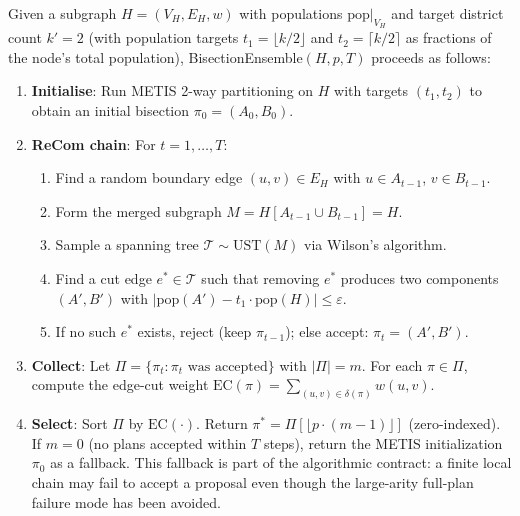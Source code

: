 \begin{definition}
  \label{def:be-primitive}
  Given a subgraph $H = (V_H, E_H, w)$ with populations $\text{pop}|_{V_H}$ and
  target district count $k' = 2$ (with population targets $t_1 = \lfloor k/2
  \rfloor$ and $t_2 = \lceil k/2 \rceil$ as fractions of the node's total
  population), \textup{BisectionEnsemble}$(H, p, T)$ proceeds as follows:
  \begin{enumerate}
    \item \textbf{Initialise}: Run METIS 2-way partitioning on $H$ with targets
          $(t_1, t_2)$ to obtain an initial bisection $\pi_0 = (A_0, B_0)$.
    \item \textbf{ReCom chain}: For $t = 1, \ldots, T$:
          \begin{enumerate}
            \item Find a random boundary edge $(u, v) \in E_H$ with
                  $u \in A_{t-1}$, $v \in B_{t-1}$.
            \item Form the merged subgraph $M = H[A_{t-1} \cup B_{t-1}] = H$.
            \item Sample a spanning tree $\mathcal{T} \sim \text{UST}(M)$ via
                  Wilson's algorithm.
            \item Find a cut edge $e^* \in \mathcal{T}$ such that removing $e^*$
                  produces two components $(A', B')$ with
                  $|\text{pop}(A') - t_1 \cdot \text{pop}(H)| \leq \varepsilon$.
            \item If no such $e^*$ exists, reject (keep $\pi_{t-1}$); else
                  accept: $\pi_t = (A', B')$.
          \end{enumerate}
    \item \textbf{Collect}: Let $\Pi = \{\pi_t : \pi_t \text{ was accepted}\}$
          with $|\Pi| = m$. For each $\pi \in \Pi$, compute the edge-cut
          weight $\text{EC}(\pi) = \sum_{(u,v) \in \delta(\pi)} w(u,v)$.
    \item \textbf{Select}: Sort $\Pi$ by $\text{EC}(\cdot)$. Return
          $\pi^* = \Pi[\lfloor p \cdot (m-1) \rfloor]$ (zero-indexed).
          If $m = 0$ (no plans accepted within $T$ steps), return the METIS
          initialization $\pi_0$ as a fallback. This fallback is part of the
          algorithmic contract: a finite local chain may fail to accept a
          proposal even though the large-arity full-plan failure mode has been
          avoided.
  \end{enumerate}
\end{definition}

